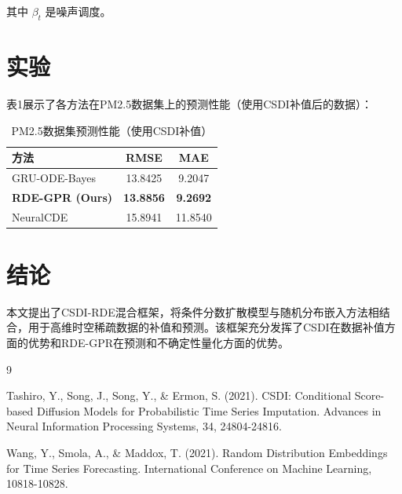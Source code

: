 \documentclass[12pt, a4paper]{article}
\begin{document}
其中 $\beta_t$ 是噪声调度。

\section{实验}

表1展示了各方法在PM2.5数据集上的预测性能（使用CSDI补值后的数据）：

\begin{table}[H]
    \centering
    \caption{PM2.5数据集预测性能（使用CSDI补值）}
    \label{tab:pm25_results}
    \begin{tabular}{lcc}
        \toprule
        方法 & RMSE & MAE \\
        \midrule
        GRU-ODE-Bayes & 13.8425 & 9.2047 \\
        \textbf{RDE-GPR (Ours)} & \textbf{13.8856} & \textbf{9.2692} \\
        NeuralCDE & 15.8941 & 11.8540 \\
        \bottomrule
    \end{tabular}
\end{table}

\section{结论}

本文提出了CSDI-RDE混合框架，将条件分数扩散模型与随机分布嵌入方法相结合，用于高维时空稀疏数据的补值和预测。该框架充分发挥了CSDI在数据补值方面的优势和RDE-GPR在预测和不确定性量化方面的优势。

\begin{thebibliography}{9}

Tashiro, Y., Song, J., Song, Y., \& Ermon, S. (2021). CSDI: Conditional Score-based Diffusion Models for Probabilistic Time Series Imputation. Advances in Neural Information Processing Systems, 34, 24804-24816.

Wang, Y., Smola, A., \& Maddox, T. (2021). Random Distribution Embeddings for Time Series Forecasting. International Conference on Machine Learning, 10818-10828.

\end{thebibliography}
\end{document}
